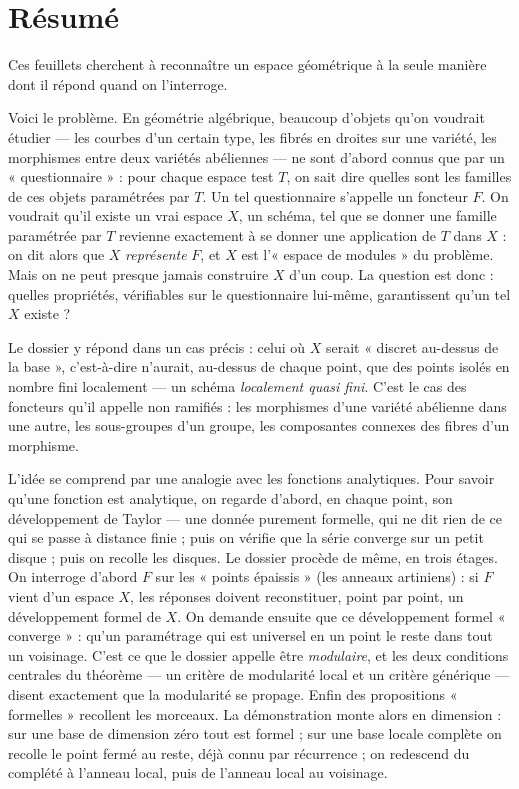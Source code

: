 \documentclass[11pt,a4paper]{article}
\begin{document}
\section*{Résumé}

\begin{resume}
Ces feuillets cherchent à reconnaître un espace géométrique à la seule manière
dont il répond quand on l'interroge.

Voici le problème. En géométrie algébrique, beaucoup d'objets qu'on voudrait
étudier — les courbes d'un certain type, les fibrés en droites sur une
variété, les morphismes entre deux variétés abéliennes — ne sont d'abord
connus que par un « questionnaire » : pour chaque espace test $T$, on sait dire
quelles sont les familles de ces objets paramétrées par $T$. Un tel
questionnaire s'appelle un foncteur $F$. On voudrait qu'il existe un vrai
espace $X$, un schéma, tel que se donner une famille paramétrée par $T$
revienne exactement à se donner une application de $T$ dans $X$ : on dit alors
que $X$ \emph{représente} $F$, et $X$ est l'« espace de modules » du problème.
Mais on ne peut presque jamais construire $X$ d'un coup. La question est donc :
quelles propriétés, vérifiables sur le questionnaire lui-même, garantissent
qu'un tel $X$ existe ?

Le dossier y répond dans un cas précis : celui où $X$ serait « discret
au-dessus de la base », c'est-à-dire n'aurait, au-dessus de chaque point, que
des points isolés en nombre fini localement — un schéma \emph{localement quasi
fini}. C'est le cas des foncteurs qu'il appelle non ramifiés : les morphismes
d'une variété abélienne dans une autre, les sous-groupes d'un groupe, les
composantes connexes des fibres d'un morphisme.

L'idée se comprend par une analogie avec les fonctions analytiques. Pour
savoir qu'une fonction est analytique, on regarde d'abord, en chaque point,
son développement de Taylor — une donnée purement formelle, qui ne dit rien de
ce qui se passe à distance finie ; puis on vérifie que la série converge sur
un petit disque ; puis on recolle les disques. Le dossier procède de même, en
trois étages. On interroge d'abord $F$ sur les « points épaissis »
(les anneaux artiniens) : si $F$ vient d'un espace $X$, les réponses doivent
reconstituer, point par point, un développement formel de $X$. On demande
ensuite que ce développement formel « converge » : qu'un paramétrage qui est
universel en un point le reste dans tout un voisinage. C'est ce que le dossier
appelle être \emph{modulaire}, et les deux conditions centrales du théorème —
un critère de modularité local et un critère générique — disent exactement que
la modularité se propage. Enfin des propositions « formelles » recollent les
morceaux. La démonstration monte alors en dimension : sur une base de
dimension zéro tout est formel ; sur une base locale complète on recolle le
point fermé au reste, déjà connu par récurrence ; on redescend du complété à
l'anneau local, puis de l'anneau local au voisinage.


\end{resume}
\end{document}
